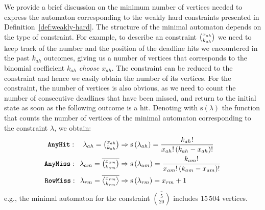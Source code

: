 We provide a brief discussion on the minimum number of vertices needed to express the automaton corresponding to the weakly hard constraints presented in Definition~\ref{def:weakly-hard}.
The structure of the minimal automaton depends on the type of constraint.
For example, to describe an \tAH{} constraint $\binom{x_{ah}}{k_{ah}}$ we need to keep track of the number and the position of the deadline hits we encountered in the past $k_{ah}$ outcomes, giving us a number of vertices that corresponds to the binomial coefficient \emph{$k_{ah}$ choose $x_{ah}$}.
The \tAM{} constraint can be reduced to the \tAH{} constraint and hence we easily obtain the number of its vertices.
For the \tRM{} constraint, the number of vertices is also obvious, as we need to count the number of consecutive deadlines that have been missed, and return to the initial state as soon as the following outcome is a hit.
Denoting with $\mathrm{s}\left(\lambda\right)$ the function that counts the number of vertices of the minimal automaton corresponding to the constraint $\lambda$, we obtain:
\begin{equation*}
    \begin{aligned}
        \tAH{}:\phantom{\textbf{iii}}\lambda_{ah} = \textstyle\anyhit{ah} & \Rightarrow \mathrm{s}\left(\lambda_{ah}\right) = \frac{k_{ah}!}{x_{ah}!\,(k_{ah}-x_{ah})!}  \\
        \tAM{}:\phantom{\textbf{s}}\lambda_{am} = \textstyle\anymiss{am} & \Rightarrow \mathrm{s}\left(\lambda_{am}\right) = \frac{k_{am}!}{x_{am}!\,(k_{am}-x_{am})!}  \\
        \tRM{}:\phantom{\textbf{s}}\lambda_{rm} = \textstyle\rowmiss{rm} & \Rightarrow \mathrm{s}\left(\lambda_{rm}\right) = x_{rm}+1 \\
    \end{aligned}
\end{equation*}
e.g., the minimal automaton for the \tAM{} constraint $\overbar{\binom{5}{20}}$ includes $15\,504$ vertices.


